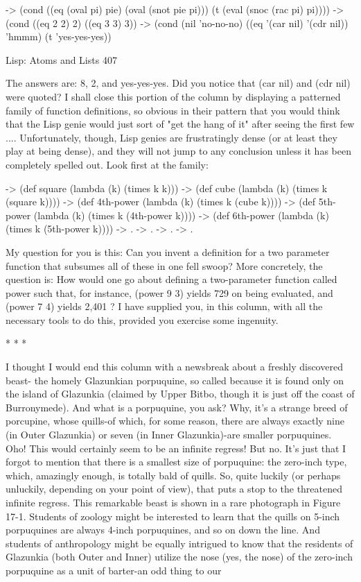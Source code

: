 -> (cond ((eq (oval pi) pie) (oval (snot pie pi)))
       (t (eval (snoc (rac pi) pi))))
-> (cond ((eq 2 2) 2) ((eq 3 3) 3))
-> (cond (nil 'no-no-no)
       ((eq '(car nil) '(cdr nil)) 'hmmm)
       (t 'yes-yes-yes))




Lisp: Atoms and Lists                                                                    407

The answers are: 8, 2, and yes-yes-yes. Did you notice that (car nil) and (cdr nil)
were quoted?
I shall close this portion of the column by displaying a patterned family of function
definitions, so obvious in their pattern that you would think that the Lisp genie would
just sort of "get the hang of it" after seeing the first few .... Unfortunately, though,
Lisp genies are frustratingly dense (or at least they play at being dense), and they will
not jump to any conclusion unless it has been completely spelled out. Look first at the
family:

-> (def square (lambda (k) (times k k)))
-> (def cube (lambda (k) (times k (square k))))
-> (def 4th-power (lambda (k) (times k (cube k))))
-> (def 5th-power (lambda (k) (times k (4th-power k))))
-> (def 6th-power (lambda (k) (times k (5th-power k))))
-> .
-> .
-> .
-> .

My question for you is this: Can you invent a definition for a two parameter function
that subsumes all of these in one fell swoop? More concretely, the question is: How
would one go about defining a two-parameter function called power such that, for
instance, (power 9 3) yields 729 on being evaluated, and (power 7 4) yields 2,401 ? I
have supplied you, in this column, with all the necessary tools to do this, provided you
exercise some ingenuity.

                                        *   *   *

I thought I would end this column with a newsbreak about a freshly discovered beast-
the homely Glazunkian porpuquine, so called because it is found only on the island of
Glazunkia (claimed by Upper Bitbo, though it is just off the coast of Burronymede).
And what is a porpuquine, you ask? Why, it's a strange breed of porcupine, whose
quills-of which, for some reason, there are always exactly nine (in Outer Glazunkia)
or seven (in Inner Glazunkia)-are smaller porpuquines. Oho! This would certainly
seem to be an infinite regress! But no. It's just that I forgot to mention that there is a
smallest size of porpuquine: the zero-inch type, which, amazingly enough, is totally
bald of quills. So, quite luckily (or perhaps unluckily, depending on your point of
view), that puts a stop to the threatened infinite regress. This remarkable beast is
shown in a rare photograph in Figure 17-1.
        Students of zoology might be interested to learn that the quills on 5-inch
porpuquines are always 4-inch porpuquines, and so on down the line. And students of
anthropology might be equally intrigued to know that the residents of Glazunkia (both
Outer and Inner) utilize the nose (yes, the nose) of the zero-inch porpuquine as a unit
of barter-an odd thing to our




